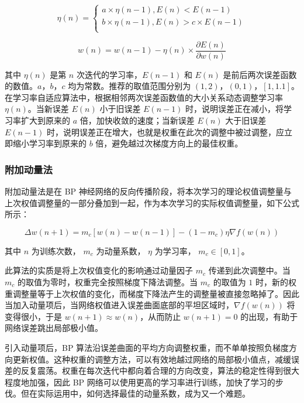 \documentclass[UTF8]{ctexart}
\begin{document}
\begin{equation}
\eta(n)=\begin{cases}
a \times \eta (n-1), E(n) < E(n-1) \\
b \times \eta (n-1), E(n) > c \times E(n-1) \\
\end{cases}
\end{equation}

\begin{equation}
w(n) = w(n-1) - \eta(n) \times \frac{\partial E(n)}{\partial w(n)}
\end{equation}

其中 $\eta(n)$ 是第 $n$ 次迭代的学习率，$E(n-1)$ 和 $E(n)$ 是前后两次误差函数的数值。$a$，$b$，$c$ 均为常数。推荐的取值范围分别为 $(1,2)$，$(0,1)$，$[1,1.1]$。在学习率自适应算法中，根据相邻两次误差函数值的大小关系动态调整学习率 $\eta(n)$。当新误差 $E(n)$ 小于旧误差 $E(n-1)$ 时，说明误差正在减小，将学习率扩大到原来的 $a$ 倍，加快收敛的速度；当新误差 $E(n)$ 大于旧误差 $E(n-1)$ 时，说明误差正在增大，也就是权重在此次的调整中被过调整，应立即缩小学习率到原来的 $b$ 倍，避免越过次梯度方向上的最佳权重。

\subsubsection{附加动量法}

附加动量法是在 BP 神经网络的反向传播阶段，将本次学习的理论权值调整量与上次权值调整量的一部分叠加到一起，作为本次学习的实际权值调整量，如下公式所示： \par

\begin{equation}
\Delta w(n+1) = m_c[w(n) - w(n-1)] - (1-m_c) \eta \nabla f(w(n))
\end{equation}

其中 $n$ 为训练次数， $m_c$ 为动量系数， $\eta$ 为学习率， $m_c \in [0,1]$。 \par

此算法的实质是将上次权值变化的影响通过动量因子 $m_c$ 传递到此次调整中。当 $m_c$ 的取值为零时，权重完全按照梯度下降法调整。当 $m_c$ 的取值为 $1$ 时，新的权重调整量等于上次权值的变化，而梯度下降法产生的调整量被直接忽略掉了。因此当加入动量项后，当网络权值进入误差曲面底部的平坦区域时，$\nabla f(w(n))$ 将变得很小，于是 $w(n+1) \approx w(n)$，从而防止 $w(n+1) = 0$ 的出现，有助于网络误差跳出局部极小值。\par

引入动量项后，BP 算法沿误差曲面的平均方向调整权重，而不单单按照负梯度方向更新权值。这种权重的调整方法，可以有效地越过网络的局部极小值点，减缓误差的反复震荡。权重在每次迭代中都向着合理的方向改变，算法的稳定性得到很大程度地加强，因此 BP 网络可以使用更高的学习率进行训练，加快了学习的步伐。但在实际运用中，如何选择最佳的动量系数，成为又一个难题。 
\end{document}
